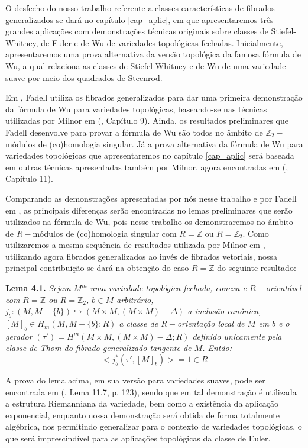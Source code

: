 \documentclass[12pt,oneside]{book} %
\newcommand{\Z}{\mathbb{Z}}
\begin{document}
\par O desfecho do nosso trabalho referente a classes características de fibrados generalizados se dará no capítulo \ref{cap_aplic}, em que apresentaremos três grandes aplicações com demonstrações técnicas originais sobre classes de Stiefel-Whitney, de Euler e de Wu de variedades topológicas fechadas. Inicialmente, apresentaremos uma prova alternativa da versão topológica da famosa fórmula de Wu, a qual relaciona as classes de Stiefel-Whitney e de Wu de uma variedade suave por meio dos quadrados de Steenrod.

\par Em \cite{fadell_1}, Fadell utiliza os fibrados generalizados para dar uma primeira demonstração da fórmula de Wu para variedades topológicas, baseando-se nas técnicas utilizadas por Milnor em (\cite{milnor_2}, Capítulo 9). Ainda, os resultados preliminares que Fadell desenvolve para provar a fórmula de Wu são todos no âmbito de $\Z_{2}-$módulos de (co)homologia singular. Já a prova alternativa da fórmula de Wu para variedades topológicas que apresentaremos no capítulo \ref{cap_aplic} será baseada em outras técnicas apresentadas também por Milnor, agora encontradas em (\cite{milnor_1}, Capítulo 11).

\par Comparando as demonstrações apresentadas por nós nesse trabalho e por Fadell em \cite{fadell_1}, as principais diferenças serão encontradas no lemas preliminares que serão utilizados na fórmula de Wu, pois nesse trabalho os demonstraremos no âmbito de $R-$módulos de (co)homologia singular com $R=\Z$ ou $R=\Z_{2}$. Como utilizaremos a mesma sequência de resultados utilizada por Milnor em \cite{milnor_1}, utilizando agora fibrados generalizados ao invés de fibrados vetoriais, nossa principal contribuição se dará na obtenção do caso $R=\Z$ do seguinte resultado:\newline

\par\textbf{Lema 4.1. }\textit{Sejam $M^{m}$ uma variedade topológica fechada, conexa e $R-$orientável com $R=\Z$ ou $R=\Z_{2}$, $b\in M$ arbitrário, $j_{b}:(M,M-\{b\})\hookrightarrow (M\times M,(M\times M)-\Delta)$ a inclusão canônica, $[M]_{b}\in H_{m}(M,M-\{b\};R)$ a classe de $R-$orientação local de $M$ em $b$ e o gerador $(\tau')=H^{m}(M\times M,(M\times M)-\Delta;R)$ definido unicamente pela classe de Thom do fibrado generalizado tangente de $M$. Então:
	$$ <j_{b}^{*}(\tau',[M]_{b})>=1\in R $$}

\par A prova do lema acima, em sua versão para variedades suaves, pode ser encontrada em (\cite{milnor_1}, Lema 11.7, p. 123), sendo que em tal demonstração é utilizada a estrutura Riemanniana da variedade, bem como a existência da aplicação exponencial, enquanto nossa demonstração será obtida de forma totalmente algébrica, nos permitindo generalizar para o contexto de variedades topológicas, o que será imprescindível para as aplicações topológicas da classe de Euler.
\end{document}

